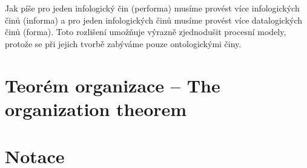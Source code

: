 \documentclass[]{article}
\begin{document}
Jak píše \cite{Vejrazkova2013} pro jeden infologický čin (performa) musíme provést více infologických činů (informa) a pro jeden infologických činů musíme provést více datalogických činů (forma). Toto rozlišení umožňuje výrazně zjednodušit procesní modely, protože se při jejich tvorbě zabýváme pouze ontologickými činy.

\section{Teorém organizace – The organization theorem}
\section{Notace}

\nocite{*}


\end{document}

